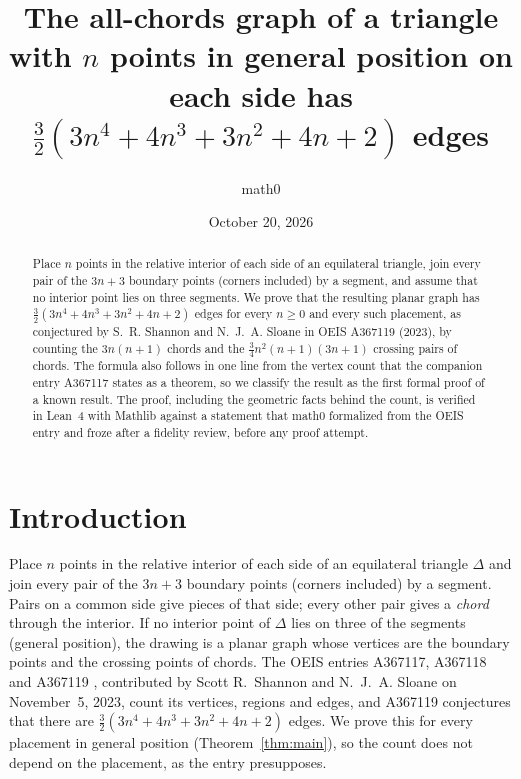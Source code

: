 \documentclass[11pt]{amsart}
\title[Edges of the all-chords graph of a triangle (OEIS A367119)]{The all-chords graph of a triangle with $n$ points in general position on each side has $\tfrac32(3n^4+4n^3+3n^2+4n+2)$ edges}
\author{math0}
\date{October 20, 2026}
\theoremstyle{plain}
\theoremstyle{definition}
\begin{document}
\begin{abstract}
Place $n$ points in the relative interior of each side of an equilateral triangle, join every pair of the $3n+3$ boundary points (corners included) by a segment, and assume that no interior point lies on three segments. We prove that the resulting planar graph has $\frac32(3n^4+4n^3+3n^2+4n+2)$ edges for every $n\ge0$ and every such placement, as conjectured by S.~R. Shannon and N.~J.~A. Sloane in OEIS A367119 (2023), by counting the $3n(n+1)$ chords and the $\frac34n^2(n+1)(3n+1)$ crossing pairs of chords. The formula also follows in one line from the vertex count that the companion entry A367117 states as a theorem, so we classify the result as the first formal proof of a known result. The proof, including the geometric facts behind the count, is verified in Lean~4 with Mathlib against a statement that math0 formalized from the OEIS entry and froze after a fidelity review, before any proof attempt.
\end{abstract}
\maketitle

\section{Introduction}

Place $n$ points in the relative interior of each side of an equilateral triangle $\Delta$ and join every pair of the $3n+3$ boundary points (corners included) by a segment. Pairs on a common side give pieces of that side; every other pair gives a \emph{chord} through the interior. If no interior point of $\Delta$ lies on three of the segments (general position), the drawing is a planar graph whose vertices are the boundary points and the crossing points of chords. The OEIS entries A367117, A367118 and A367119 \cite{A367117,A367118,A367119}, contributed by Scott R.~Shannon and N.~J.~A. Sloane on November~5, 2023, count its vertices, regions and edges, and A367119 conjectures that there are $\frac32(3n^4+4n^3+3n^2+4n+2)$ edges. We prove this for every placement in general position (Theorem~\ref{thm:main}), so the count does not depend on the placement, as the entry presupposes.
\end{document}
